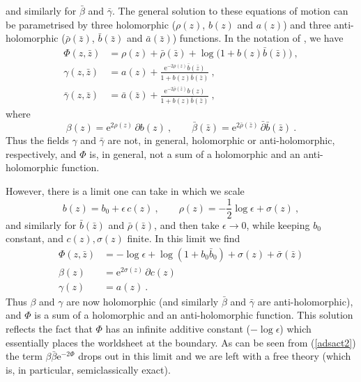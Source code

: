\documentclass[12pt,a4paper]{article}
\newcommand{\be}{\begin{equation}}
\newcommand{\ee}{\end{equation}}
\begin{document}
and similarly for $\bar{\beta}$ and $\bar{\gamma}$. 
The general solution to these equations of motion can be parametrised by three holomorphic ($\rho(z)$, $b(z)$ and $a(z)$) and three anti-holomorphic ($\bar\rho(\bar{z})$, $\bar{b}(\bar{z})$ and $\bar{a}(\bar{z})$) functions. In the notation of \cite{deBoer:1998gyt}, we have 
\begin{subequations}\label{eq:classsol}
\begin{align}
\Phi(z,\bar{z}) &= \rho(z) +\bar{\rho}(\bar{z})+\log\big(1+b(z)\bar{b}(\bar{z})\big) \ ,\\
\gamma(z,\bar{z}) &= a(z) + \frac{\mathrm{e}^{-2\rho(z)}\bar{b}(\bar{z})}{1+b(z)\bar{b}(\bar{z})} \ ,\\
\bar{\gamma} (z,\bar{z})&= \bar{a}(\bar{z}) + \frac{\mathrm{e}^{-2\bar{\rho}(\bar{z})}b(z)}{1+b(z)\bar{b}(\bar{z})}\ ,
\end{align}
\end{subequations}
where 
\be
\beta(z) = \mathrm{e}^{2\rho(z)} \, \partial b (z) \ , \qquad \bar\beta (\bar{z}) = \mathrm{e}^{2\bar\rho(\bar{z})} \, \bar\partial \bar{b} (\bar{z})\ . 
\ee
Thus the fields $\gamma$ and $\bar{\gamma}$ are not, in general, holomorphic or anti-holomorphic, respectively, and $\Phi$ is, in general, not a sum of a holomorphic and an anti-holomorphic function. 

However, there is a limit one can take in which we scale 
\be\label{scalim}
b(z) = b_0 + \epsilon \, c(z) \ ,\qquad \rho(z) = - \frac{1}{2}  \log\epsilon + \sigma(z) \ , 
\ee
and similarly for $\bar{b}(\bar{z})$ and $\bar{\rho}(\bar{z})$, and then take $\epsilon \rightarrow 0$, while keeping 
$b_0$ constant, and $c(z), \sigma(z)$ finite. In this limit we find 
\begin{subequations}\label{limsol}
 \begin{align}
\Phi(z,\bar{z}) &= -\log{\epsilon} + \log(1 + b_0 \bar{b}_0) +  \sigma(z) +\bar{\sigma}(\bar{z}) \\
\beta(z) &= \mathrm{e}^{2\sigma(z)} \, \partial c (z)  \\
\gamma(z) &=a(z)  \ . 
\end{align}
\end{subequations}
Thus $\beta$ and $\gamma$ are now holomorphic (and similarly $\bar\beta$ and  $\bar\gamma$ are anti-holo\-mor\-phic), and $\Phi$ is a sum of a holomorphic and an anti-holomorphic function. This solution reflects the fact that $\Phi$ has an infinite additive constant ($-\log{\epsilon}$) which essentially places the worldsheet at the boundary. As can be seen from (\ref{adsact2}) the term $\beta\bar{\beta} \mathrm{e}^{-2\Phi}$ drops out in this limit and we are left with a free theory \cite{deBoer:1998gyt} (which is, in particular, semiclassically exact). 
\end{document}
